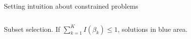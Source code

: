 \documentclass[mathserif, aspectratio=169]{beamer}
\begin{document}
\begin{frame}{Setting intuition about constrained problems}
\begin{columns}
\pause
{}
\begin{center}
Subset selection.  If $\sum_{k=1}^K I(\beta_k) \le 1$, solutions in blue area.
\end{center}


\end{columns}
\end{frame}
\end{document}

